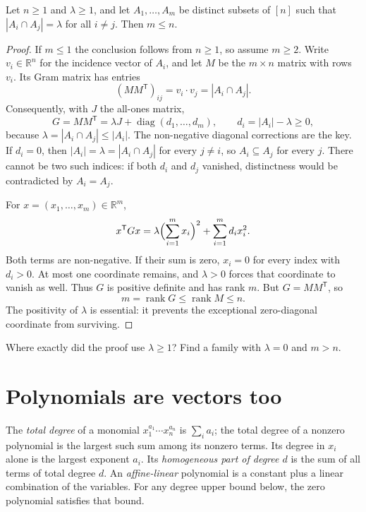 \begin{theorem}\label{combinatorial:thm:fisher}
Let $n\ge1$ and $\lambda\ge1$, and let $A_1,\dots,A_m$ be distinct subsets of $[n]$ such that $|A_i\cap A_j|=\lambda$ for all $i\ne j$. Then $m\le n$.
\end{theorem}
\begin{proof}
If $m\le1$ the conclusion follows from $n\ge1$, so assume
$m\ge2$. Write $v_i\in\mathbb R^n$ for the incidence vector
of $A_i$, and let $M$ be the $m\times n$ matrix with rows $v_i$.
Its Gram matrix has entries
\[
(MM^{\mathsf T})_{ij}=v_i\cdot v_j=|A_i\cap A_j|.
\]
Consequently, with $J$ the all-ones matrix,
\[
G=MM^{\mathsf T}=\lambda J+
\operatorname{diag}(d_1,\ldots,d_m),
\qquad d_i=|A_i|-\lambda\ge0,
\]
because $\lambda=|A_i\cap A_j|\le|A_i|$.
The non-negative diagonal corrections are the key. If $d_i=0$,
then $|A_i|=\lambda=|A_i\cap A_j|$ for every $j\ne i$,
so $A_i\subseteq A_j$ for every $j$. There cannot be two
such indices: if both $d_i$ and $d_j$ vanished, distinctness
would be contradicted by $A_i=A_j$.

For $x=(x_1,\ldots,x_m)\in\mathbb R^m$,
\[
x^{\mathsf T}Gx
=\lambda\Bigl(\sum_{i=1}^m x_i\Bigr)^2
 +\sum_{i=1}^m d_ix_i^2.
\]
Both terms are non-negative. If their sum is zero,
$x_i=0$ for every index with $d_i>0$. At most one
coordinate remains, and $\lambda>0$ forces that coordinate
to vanish as well. Thus $G$ is positive definite and has
rank $m$. But $G=MM^{\mathsf T}$, so
\[
m=\operatorname{rank}G\le\operatorname{rank}M\le n.
\]
The positivity of $\lambda$ is essential: it prevents
the exceptional zero-diagonal coordinate from surviving.
\end{proof}

\begin{think}
Where exactly did the proof use $\lambda\ge1$? Find a family with $\lambda=0$ and $m>n$.
\end{think}

\section{Polynomials are vectors too}

The \emph{total degree} of a monomial $x_1^{a_1}\cdots x_n^{a_n}$ is
$\sum_i a_i$; the total degree of a nonzero polynomial is the largest such
sum among its nonzero terms. Its degree in $x_i$ alone is the largest
exponent $a_i$. Its \emph{homogeneous part of degree $d$} is the sum of all
terms of total degree $d$. An \emph{affine-linear} polynomial is a constant
plus a linear combination of the variables. For any degree upper bound
below, the zero polynomial satisfies that bound.


